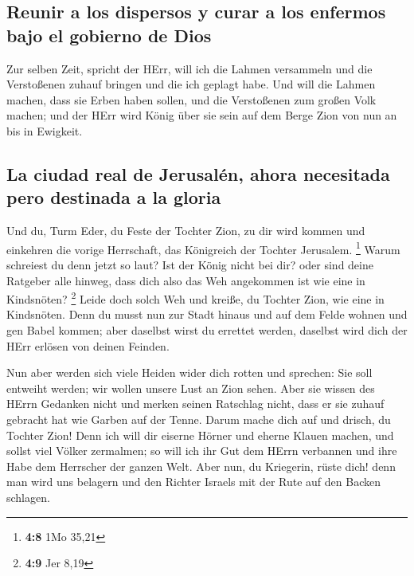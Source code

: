 \hypertarget{reunir-a-los-dispersos-y-curar-a-los-enfermos-bajo-el-gobierno-de-dios}{%
\subsection{Reunir a los dispersos y curar a los enfermos bajo el
gobierno de
Dios}\label{reunir-a-los-dispersos-y-curar-a-los-enfermos-bajo-el-gobierno-de-dios}}

 Zur selben Zeit, spricht der HErr, will ich die Lahmen
versammeln und die Verstoßenen zuhauf bringen und die ich geplagt habe.
 Und will die Lahmen machen, dass sie Erben haben sollen,
und die Verstoßenen zum großen Volk machen; und der HErr wird König über
sie sein auf dem Berge Zion von nun an bis in Ewigkeit.

\hypertarget{la-ciudad-real-de-jerusaluxe9n-ahora-necesitada-pero-destinada-a-la-gloria}{%
\subsection{La ciudad real de Jerusalén, ahora necesitada pero destinada
a la
gloria}\label{la-ciudad-real-de-jerusaluxe9n-ahora-necesitada-pero-destinada-a-la-gloria}}

 Und du, Turm Eder, du Feste der Tochter Zion, zu dir wird
kommen und einkehren die vorige Herrschaft, das Königreich der Tochter
Jerusalem. \footnote{\textbf{4:8} 1Mo 35,21}  Warum
schreiest du denn jetzt so laut? Ist der König nicht bei dir? oder sind
deine Ratgeber alle hinweg, dass dich also das Weh angekommen ist wie
eine in Kindsnöten? \footnote{\textbf{4:9} Jer 8,19} 
Leide doch solch Weh und kreiße, du Tochter Zion, wie eine in
Kindsnöten. Denn du musst nun zur Stadt hinaus und auf dem Felde wohnen
und gen Babel kommen; aber daselbst wirst du errettet werden, daselbst
wird dich der HErr erlösen von deinen Feinden.

 Nun aber werden sich viele Heiden wider dich rotten und
sprechen: Sie soll entweiht werden; wir wollen unsere Lust an Zion
sehen.  Aber sie wissen des HErrn Gedanken nicht und
merken seinen Ratschlag nicht, dass er sie zuhauf gebracht hat wie
Garben auf der Tenne.  Darum mache dich auf und drisch,
du Tochter Zion! Denn ich will dir eiserne Hörner und eherne Klauen
machen, und sollst viel Völker zermalmen; so will ich ihr Gut dem HErrn
verbannen und ihre Habe dem Herrscher der ganzen Welt. 
Aber nun, du Kriegerin, rüste dich! denn man wird uns belagern und den
Richter Israels mit der Rute auf den Backen schlagen.

